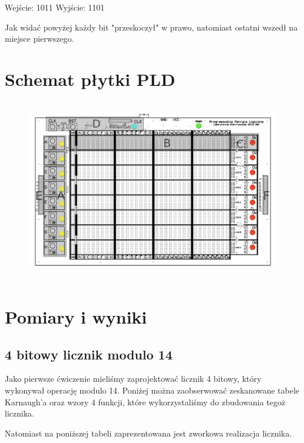 \documentclass[a4paper,12pt]{article}
\begin{document}
\begin{justify}
Wejście: 1011
Wyjście: 1101

Jak widać powyżej każdy bit "przeskoczył" w prawo, natomiast ostatni wszedł na miejsce pierwszego.

\section{Schemat płytki PLD}

\begin{figure}[h!]
\centering
\includegraphics[width=15cm, height=8cm]{pld}
\end{figure}

\section{Pomiary i wyniki}

\subsection{4 bitowy licznik modulo 14}

Jako pierwsze ćwiczenie mieliśmy zaprojektować licznik 4 bitowy, który wykonywał operację modulo 14. Poniżej można zaobserwować zeskanowane tabele Karnaugh'a oraz wzory 4 funkcji, które wykorzystaliśmy do zbudowania tegoż licznika.

\newpage





\newpage

Natomiast na poniższej tabeli zaprezentowana jest zworkowa realizacja licznika.


\end{justify}
\end{document}
